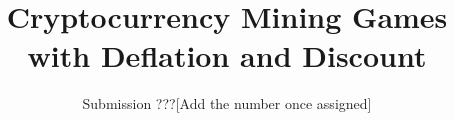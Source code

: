\documentclass[format=acmsmall, review=false]{acmart}
\begin{document}
\title{Cryptocurrency Mining Games with Deflation and Discount}
\author{Submission ???[Add the number once assigned]}



\maketitle

\newpage










\newpage
\onecolumn
\appendix


\end{document}
